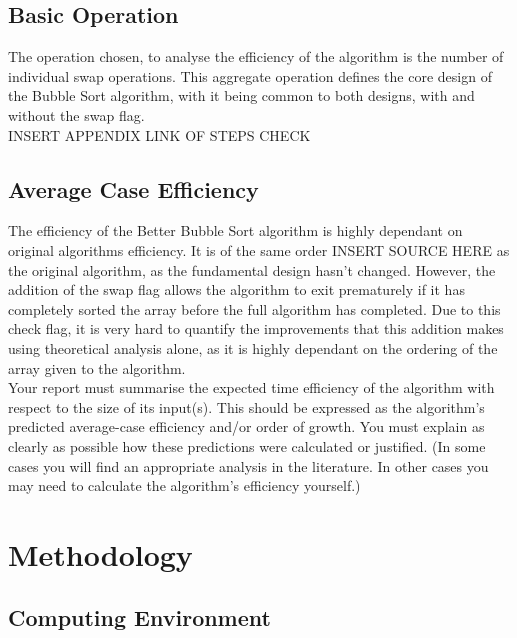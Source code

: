 \documentclass[]{article}
\begin{document}
\subsection{Basic Operation}
The operation chosen, to analyse the efficiency of the algorithm is the number of individual swap operations. This aggregate operation defines the core design of the Bubble Sort algorithm, with it being common to both designs, with and without the swap flag.
\\
INSERT APPENDIX LINK OF STEPS CHECK
\\
\subsection{Average Case Efficiency}
The efficiency of the Better Bubble Sort algorithm is highly dependant on original algorithms efficiency. It is of the same order INSERT SOURCE HERE as the original algorithm, as the fundamental design hasn't changed. However, the addition of the swap flag allows the algorithm to exit prematurely if it has completely sorted the array before the full algorithm has completed. Due to this check flag, it is very hard to quantify the improvements that this addition makes using theoretical analysis alone, as it is highly dependant on the ordering of the array given to the algorithm. 
\\
Your report must summarise the expected time efficiency of the algorithm with respect to the
size of its input(s). This should be expressed as the algorithm’s predicted average-case
efficiency and/or order of growth. You must explain as clearly as possible how these
predictions were calculated or justified. (In some cases you will find an appropriate analysis
in the literature. In other cases you may need to calculate the algorithm’s efficiency yourself.)
\section{Methodology}
\subsection{Computing Environment}
\end{document}
